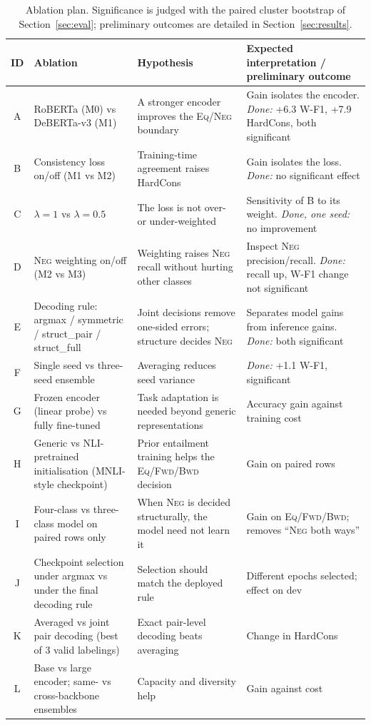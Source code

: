 \documentclass[10pt,a4paper,twocolumn]{article}
\newcommand{\Eq}{\textsc{Eq}}
\newcommand{\Fwd}{\textsc{Fwd}}
\newcommand{\Bwd}{\textsc{Bwd}}
\newcommand{\Neg}{\textsc{Neg}}
\begin{document}
\begin{table}[!t]
\centering
\footnotesize
\begin{tabularx}{\textwidth}{c >{\raggedright\arraybackslash}p{3.7cm} >{\raggedright\arraybackslash}p{4.6cm} Y}
\toprule
ID & Ablation & Hypothesis & Expected interpretation / preliminary outcome \\
\midrule
A & RoBERTa (M0) vs DeBERTa-v3 (M1) & A stronger encoder improves the \Eq/\Neg{} boundary & Gain isolates the encoder. \emph{Done:} +6.3 W-F1, +7.9 HardCons, both significant \\
B & Consistency loss on/off (M1 vs M2) & Training-time agreement raises HardCons & Gain isolates the loss. \emph{Done:} no significant effect \\
C & $\lambda=1$ vs $\lambda=0.5$ & The loss is not over- or under-weighted & Sensitivity of B to its weight. \emph{Done, one seed:} no improvement \\
D & \Neg{} weighting on/off (M2 vs M3) & Weighting raises \Neg{} recall without hurting other classes & Inspect \Neg{} precision/recall. \emph{Done:} recall up, W-F1 change not significant \\
E & Decoding rule: argmax / symmetric / struct\_pair / struct\_full & Joint decisions remove one-sided errors; structure decides \Neg & Separates model gains from inference gains. \emph{Done:} both significant \\
F & Single seed vs three-seed ensemble & Averaging reduces seed variance & \emph{Done:} +1.1 W-F1, significant \\
\midrule
G & Frozen encoder (linear probe) vs fully fine-tuned & Task adaptation is needed beyond generic representations & Accuracy gain against training cost \\
H & Generic vs NLI-pretrained initialisation (MNLI-style checkpoint) & Prior entailment training helps the \Eq/\Fwd/\Bwd{} decision & Gain on paired rows \\
I & Four-class vs three-class model on paired rows only & When \Neg{} is decided structurally, the model need not learn it & Gain on \Eq/\Fwd/\Bwd; removes ``\Neg{} both ways'' \\
J & Checkpoint selection under argmax vs under the final decoding rule & Selection should match the deployed rule & Different epochs selected; effect on dev \\
K & Averaged vs joint pair decoding (best of 3 valid labelings) & Exact pair-level decoding beats averaging & Change in HardCons \\
L & Base vs large encoder; same- vs cross-backbone ensembles & Capacity and diversity help & Gain against cost \\
\bottomrule
\end{tabularx}
\caption{Ablation plan. Significance is judged with the paired cluster bootstrap of Section~\ref{sec:eval}; preliminary outcomes are detailed in Section~\ref{sec:results}.}
\label{tab:ablation}
\end{table}
\end{document}
